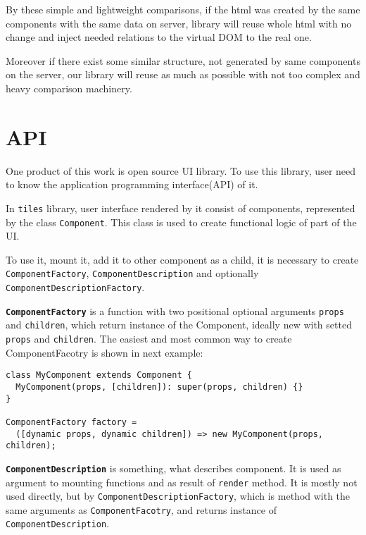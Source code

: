 \documentclass[oneside, 12pt]{book}
\begin{document}
    By these simple and lightweight comparisons, if the html was created by the same components with the same data on server, 
    library will reuse whole html with no change and inject needed relations to the virtual DOM to the real one. 

    Moreover if there exist some similar structure, not generated by same components on the server, 
    our library will reuse as much as possible with not too complex and heavy comparison machinery.

\section{API}\label{sec:our-api}

  One product of this work is open source UI library.
  To use this library, user need to know the application programming interface(API) of it. 

  In \texttt{tiles} library, user interface rendered by it consist of components, represented by the class \texttt{Component}. 
  This class is used to create functional logic of part of the UI. 

  To use it, mount it, add it to other component as a child, it is necessary to create \texttt{ComponentFactory}, 
  \texttt{ComponentDescription} and optionally \texttt{ComponentDescriptionFactory}.

  \textbf{\texttt{ComponentFactory}} is a function with two positional optional arguments \texttt{props} and \texttt{children}, 
  which return instance of the Component, ideally new with setted \texttt{props} and \texttt{children}.
  The easiest and most common way to create ComponentFacotry is shown in next example:
\begin{verbatim}
class MyComponent extends Component {
  MyComponent(props, [children]): super(props, children) {}
}

ComponentFactory factory = 
  ([dynamic props, dynamic children]) => new MyComponent(props, children);
\end{verbatim}



  \textbf{\texttt{ComponentDescription}} is something, what describes component. 
  It is used as argument to mounting functions and as result of \texttt{render} method.
  It is mostly not used directly, but by \texttt{ComponentDescriptionFactory}, 
  which is method with the same arguments as \texttt{ComponentFacotry}, and returns instance of \texttt{ComponentDescription}.
\end{document}
